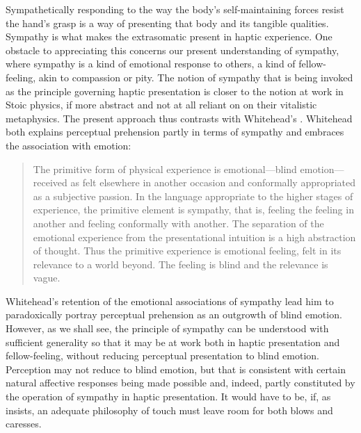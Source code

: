 Sympathetically responding to the way the body's self-maintaining forces resist the hand's grasp is a way of presenting that body and its tangible qualities. Sympathy is what makes the extrasomatic present in haptic experience. One obstacle to appreciating this concerns our present understanding of sympathy, where sympathy is a kind of emotional response to others, a kind of fellow-feeling, akin to compassion or pity. The notion of sympathy that is being invoked as the principle governing haptic presentation is closer to the notion at work in Stoic physics, if more abstract and not at all reliant on on their vitalistic metaphysics. The present approach thus contrasts with Whitehead's \citeyearpar{Whitehead:1978zr}. Whitehead both explains perceptual prehension partly in terms of sympathy and embraces the association with emotion:
\begin{quote}
	The primitive form of physical experience is emotional---blind emotion---received as felt elsewhere in another occasion and conformally appropriated as a subjective passion. In the language appropriate to the higher stages of experience, the primitive element is sympathy, that is, feeling the feeling in another and feeling conformally with another. The separation of the emotional experience from the presentational intuition is a high abstraction of thought. Thus the primitive experience is emotional feeling, felt in its relevance to a world beyond. The feeling is blind and the relevance is vague. \citep[162-3]{Whitehead:1978zr}
\end{quote}
Whitehead's retention of the emotional associations of sympathy lead him to paradoxically portray perceptual prehension as an outgrowth of blind emotion. However, as we shall see, the principle of sympathy can be understood with sufficient generality so that it may be at work both in haptic presentation and fellow-feeling, without reducing perceptual presentation to blind emotion. Perception may not reduce to blind emotion, but that is consistent with certain natural affective responses being made possible and, indeed, partly constituted by the operation of sympathy in haptic presentation. It would have to be, if, as \citet[chapter 4]{Derrida:2005aa} insists, an adequate philosophy of touch must leave room for both blows and caresses.

